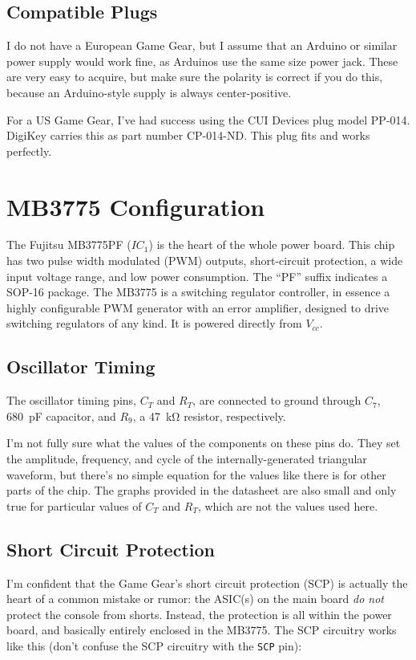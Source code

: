 \documentclass{article}
\newcommand{\Vcc}{$V_{cc}$}
\newcommand{\chippin}{\texttt}
\newcommand{\model}{\textsf}
\begin{document}
\subsection{Compatible Plugs}
I do not have a European Game Gear, but I assume that an Arduino or
similar power supply would work fine, as Arduinos use the same size
power jack. These are very easy to acquire, but make sure the polarity
is correct if you do this, because an Arduino-style supply is always
center-positive.

For a US Game Gear, I've had success using the CUI Devices plug model
\model{PP-014}. DigiKey carries this as part number
\model{CP-014-ND}. This plug fits and works perfectly.

\section{\model{MB3775} Configuration}
The Fujitsu \model{MB3775PF} ($IC_1$) is the heart of the whole power
board. This chip has two pulse width modulated (PWM) outputs,
short-circuit protection, a wide input voltage range, and low power
consumption. The ``\model{PF}'' suffix indicates a \model{SOP-16}
package. The \model{MB3775} is a switching regulator controller, in
essence a highly configurable PWM generator with an error amplifier,
designed to drive switching regulators of any kind. It is powered
directly from \Vcc{}.

\subsection{Oscillator Timing}
The oscillator timing pins, $C_T$ and $R_T$, are connected to ground
through $C_7$, \qty{680}{\pico\farad} capacitor, and $R_9$, a
\qty{47}{\kilo\ohm} resistor, respectively.

I'm not fully sure what the values of the components on these pins
do. They set the amplitude, frequency, and cycle of the
internally-generated triangular waveform, but there's no simple
equation for the values like there is for other parts of the chip. The
graphs provided in the datasheet are also small and only true for
particular values of $C_T$ and $R_T$, which are not the values used
here.

\subsection{Short Circuit Protection}
\label{sec:scp}
I'm confident that the Game Gear's short circuit protection (SCP) is
actually the heart of a common mistake or rumor: the ASIC(s) on the
main board \emph{do not} protect the console from shorts. Instead, the
protection is all within the power board, and basically entirely
enclosed in the \model{MB3775}. The SCP circuitry works like this (don't
confuse the SCP circuitry with the \chippin{SCP} pin):
\end{document}
